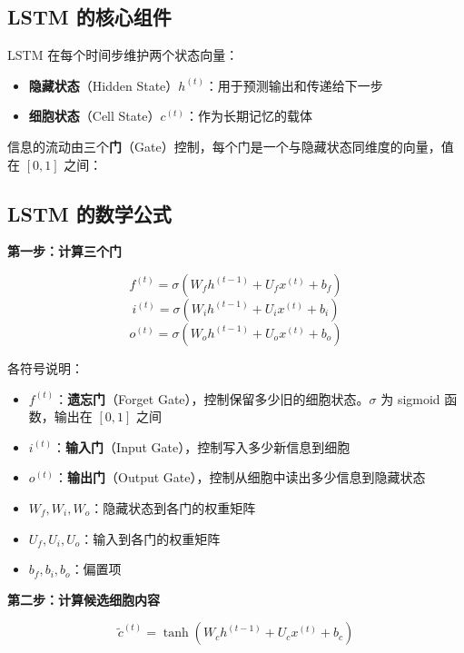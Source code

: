 \documentclass[a4paper]{article}
\begin{document}
\subsection{LSTM 的核心组件}

LSTM 在每个时间步维护两个状态向量：

\begin{itemize}
    \item \textbf{隐藏状态}（Hidden State）$h^{(t)}$：用于预测输出和传递给下一步
    \item \textbf{细胞状态}（Cell State）$c^{(t)}$：作为长期记忆的载体
\end{itemize}

信息的流动由三个\textbf{门}（Gate）控制，每个门是一个与隐藏状态同维度的向量，值在 $[0, 1]$ 之间：





\subsection{LSTM 的数学公式}





\textbf{第一步：计算三个门}

$$f^{(t)} = \sigma\left(W_f h^{(t-1)} + U_f x^{(t)} + b_f\right)$$
$$i^{(t)} = \sigma\left(W_i h^{(t-1)} + U_i x^{(t)} + b_i\right)$$
$$o^{(t)} = \sigma\left(W_o h^{(t-1)} + U_o x^{(t)} + b_o\right)$$

各符号说明：
\begin{itemize}
    \item $f^{(t)}$：\textbf{遗忘门}（Forget Gate），控制保留多少旧的细胞状态。$\sigma$ 为 sigmoid 函数，输出在 $[0,1]$ 之间
    \item $i^{(t)}$：\textbf{输入门}（Input Gate），控制写入多少新信息到细胞
    \item $o^{(t)}$：\textbf{输出门}（Output Gate），控制从细胞中读出多少信息到隐藏状态
    \item $W_f, W_i, W_o$：隐藏状态到各门的权重矩阵
    \item $U_f, U_i, U_o$：输入到各门的权重矩阵
    \item $b_f, b_i, b_o$：偏置项
\end{itemize}

\textbf{第二步：计算候选细胞内容}

$$\tilde{c}^{(t)} = \tanh\left(W_c h^{(t-1)} + U_c x^{(t)} + b_c\right)$$
\end{document}
